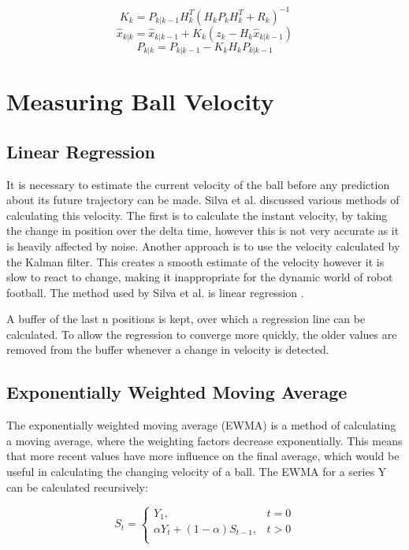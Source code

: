 \[ K_k = P_{k|k-1} H^T_k(H_k P_k H^T_k + R_k)^{-1} \]
\[ \hat{x}_{k|k} = \hat{x}_{k|k-1} + K_k(z_k - H_k \hat{x}_{k|k-1}) \]
\[ P_{k|k} = P_{k|k-1} - K_k H_k P_{k|k-1} \]

\nocite{Lauer2005}

\section{Measuring Ball Velocity}

\subsection{Linear Regression}

It is necessary to estimate the current velocity of the ball before any prediction about its future trajectory can be made. Silva et al. \cite{Silva2010} discussed various methods of calculating this velocity. The first is to calculate the instant velocity, by taking the change in position over the delta time, however this is not very accurate as it is heavily affected by noise. Another approach is to use the velocity calculated by the Kalman filter. This creates a smooth estimate of the velocity however it is slow to react to change, making it inappropriate for the dynamic world of robot football. The method used by Silva et al. is linear regression \cite{Motulsky2011}. 

A buffer of the last n positions is kept, over which a regression line can be calculated. To allow the regression to converge more quickly, the older values are removed from the buffer whenever a change in velocity is detected.

\subsection{Exponentially Weighted Moving Average}

The exponentially weighted moving average (EWMA) is a method of calculating a moving average, where the weighting factors decrease exponentially. This means that more recent values have more influence on the final average, which would be useful in calculating the changing velocity of a ball. The EWMA for a series Y can be calculated recursively:

\[ S_t = \begin{cases}
    Y_1, & t = 0 \\
    \alpha Y_t + (1-\alpha)S_{t-1}, & t > 0 \\
\end{cases}\]

